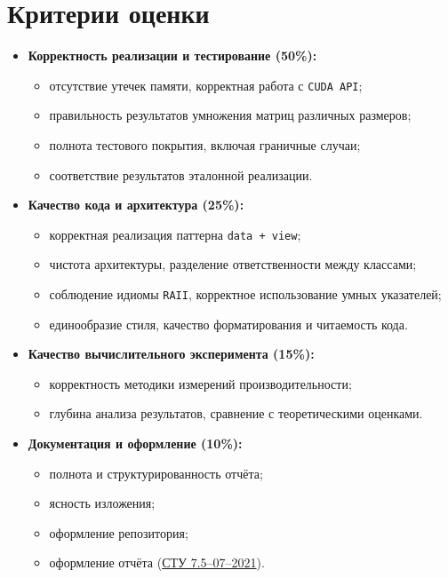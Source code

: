 \documentclass[12pt]{article}
\begin{document}
\section*{Критерии оценки}
\begin{itemize}
    \item \textbf{Корректность реализации и тестирование (50\%):}
    \begin{itemize}
        \item отсутствие утечек памяти, корректная работа с \texttt{CUDA API};
        \item правильность результатов умножения матриц различных размеров;
        \item полнота тестового покрытия, включая граничные случаи;
        \item соответствие результатов эталонной реализации.
    \end{itemize}

    \item \textbf{Качество кода и архитектура (25\%):}
    \begin{itemize}
        \item корректная реализация паттерна \texttt{data + view};
        \item чистота архитектуры, разделение ответственности между классами;
        \item соблюдение идиомы \texttt{RAII}, корректное использование умных указателей;
        \item единообразие стиля, качество форматирования и читаемость кода.
    \end{itemize}

    \item \textbf{Качество вычислительного эксперимента (15\%):}
    \begin{itemize}
        \item корректность методики измерений производительности;
        \item глубина анализа результатов, сравнение с теоретическими оценками.
    \end{itemize}

    \item \textbf{Документация и оформление (10\%):}
    \begin{itemize}
        \item полнота и структурированность отчёта;
        \item ясность изложения;
        \item оформление репозитория;
        \item оформление отчёта (\href{https://sfu.ru/sapi/file-upload/325396c75b669b84763c10b7b5c73ec1.pdf}{СТУ 7.5–07–2021}).
    \end{itemize}
\end{itemize}
\end{document}
